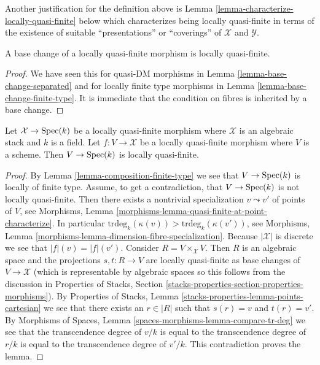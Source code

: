 \medskip\noindent
Another justification for the definition above is
Lemma \ref{lemma-characterize-locally-quasi-finite}
below which characterizes being locally quasi-finite in terms of the
existence of suitable ``presentations'' or ``coverings'' of
$\mathcal{X}$ and $\mathcal{Y}$.

\begin{lemma}
\label{lemma-base-change-locally-quasi-finite}
A base change of a locally quasi-finite morphism is locally quasi-finite.
\end{lemma}

\begin{proof}
We have seen this for quasi-DM morphisms in
Lemma \ref{lemma-base-change-separated}
and for locally finite type morphisms in
Lemma \ref{lemma-base-change-finite-type}.
It is immediate that the condition on fibres is inherited by a base change.
\end{proof}

\begin{lemma}
\label{lemma-locally-quasi-finite-over-field}
Let $\mathcal{X} \to \mathop{\rm Spec}(k)$ be a locally quasi-finite morphism
where $\mathcal{X}$ is an algebraic stack and $k$ is a field.
Let $f : V \to \mathcal{X}$ be a locally quasi-finite morphism where
$V$ is a scheme. Then $V \to \mathop{\rm Spec}(k)$ is locally quasi-finite.
\end{lemma}

\begin{proof}
By
Lemma \ref{lemma-composition-finite-type}
we see that $V \to \mathop{\rm Spec}(k)$ is locally of finite type.
Assume, to get a contradiction, that $V \to \mathop{\rm Spec}(k)$ is not
locally quasi-finite. Then there exists a nontrivial specialization
$v \leadsto v'$ of points of $V$, see
Morphisms, Lemma \ref{morphisms-lemma-quasi-finite-at-point-characterize}.
In particular $\text{trdeg}_k(\kappa(v)) > \text{trdeg}_k(\kappa(v'))$, see
Morphisms, Lemma \ref{morphisms-lemma-dimension-fibre-specialization}.
Because $|\mathcal{X}|$ is discrete we see that $|f|(v) = |f|(v')$.
Consider $R = V \times_\mathcal{X} V$. Then $R$ is an algebraic space
and the projections $s, t : R \to V$ are locally quasi-finite as base
changes of $V \to \mathcal{X}$ (which is representable by algebraic spaces
so this follows from the discussion in
Properties of Stacks, Section
\ref{stacks-properties-section-properties-morphisms}).
By
Properties of Stacks, Lemma \ref{stacks-properties-lemma-points-cartesian}
we see that there exists an $r \in |R|$ such that $s(r) = v$ and $t(r) = v'$.
By
Morphisms of Spaces, Lemma \ref{spaces-morphisms-lemma-compare-tr-deg}
we see that the transcendence degree of $v/k$ is equal to the
transcendence degree of $r/k$ is equal to the transcendence degree of
$v'/k$. This contradiction proves the lemma.
\end{proof}

